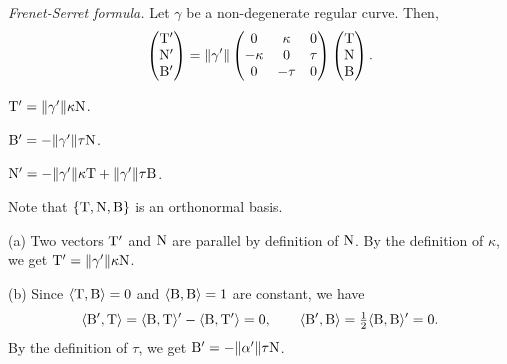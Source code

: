 \documentclass{../note}
\def\a{\alpha}
\begin{document}
\begin{prb}
\begin{prb}\emph{Frenet-Serret formula.}
Let $\gamma$ be a non-degenerate regular curve.
Then,
\[\begin{pmatrix}\mathrm{T}'\\\mathrm{N}'\\\mathrm{B}'\end{pmatrix}=\|\gamma'\|\begin{pmatrix}0&\kappa&0\\-\kappa&0&\tau\\0&-\tau&0\end{pmatrix}\begin{pmatrix}\mathrm{T}\\\mathrm{N}\\\mathrm{B}\end{pmatrix}.\]
\begin{parts}
\item $\mathrm{T}'=\|\gamma'\|\kappa\mathrm{N}$.
\item $\mathrm{B}'=-\|\gamma'\|\tau\mathrm{N}$.
\item $\mathrm{N}'=-\|\gamma'\|\kappa\mathrm{T}+\|\gamma'\|\tau\mathrm{B}$.
\end{parts}
\end{prb}
\begin{pf}
Note that $\{\mathrm{T},\mathrm{N},\mathrm{B}\}$ is an orthonormal basis.

(a)
Two vectors $\mathrm{T}'$ and $\mathrm{N}$ are parallel by definition of $\mathrm{N}$.
By the definition of $\kappa$, we get $\mathrm{T}'=\|\gamma'\|\kappa\mathrm{N}$.

(b)
Since $\langle\mathrm{T},\mathrm{B}\rangle=0$ and $\langle\mathrm{B},\mathrm{B}\rangle=1$ are constant, we have
\[\langle\mathrm{B}',\mathrm{T}\rangle=\langle\mathrm{B},\mathrm{T}\rangle'-\langle\mathrm{B},\mathrm{T}'\rangle=0,\qquad\langle\mathrm{B}',\mathrm{B}\rangle=\tfrac12\langle\mathrm{B},\mathrm{B}\rangle'=0.\]
By the definition of $\tau$, we get $\rB'=-\|\a'\|\tau\rN$.


\end{pf}
\end{prb}
\end{document}
